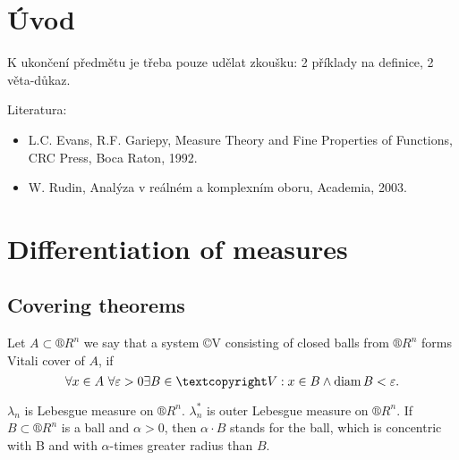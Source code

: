 \documentclass[12pt]{article}					%
\begin{document}
\section*{Úvod}
\begin{poznamka}
	K ukončení předmětu je třeba pouze udělat zkoušku: 2 příklady na definice, 2 věta-důkaz.

	Literatura:
	\begin{itemize}
		\item L.C. Evans, R.F. Gariepy, Measure Theory and Fine Properties of Functions, CRC Press, Boca Raton, 1992.
		\item W. Rudin, Analýza v reálném a komplexním oboru, Academia, 2003.
	\end{itemize}
\end{poznamka}

\section{Differentiation of measures}
\subsection{Covering theorems}

\begin{definice}
	Let $A \subset ®R^n$ we say that a system ©V consisting of closed balls from $®R^n$ forms Vitali cover of $A$, if
	$$ \forall x \in A\ \forall \epsilon > 0 \exists B \in ©V: x \in B \land \diam B < \epsilon. $$
\end{definice}

\begin{definice}[Notation]
	$\lambda_n$ is Lebesgue measure on $®R^n$. $\lambda_n^*$ is outer Lebesgue measure on $®R^n$. If $B \subset ®R^n$ is a ball and $\alpha > 0$, then $\alpha · B$ stands for the ball, which is concentric with B and with $\alpha$-times greater radius than $B$.
\end{definice}
\end{document}
